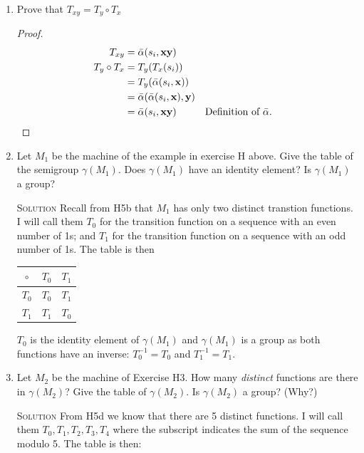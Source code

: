 \documentclass[twoside]{amsart}
\newcommand{\solution}{\textsc{Solution}\xspace}
\begin{document}
\begin{enumerate}[A.]
\begin{enumerate}[1]
      \item Prove that $T_{xy}=T_y \circ T_x$
      \begin{proof}
	  \begin{align*}
             T_{xy} &= \bar{\alpha}(s_i,\mathbf{x}\mathbf{y})\\
	     T_y \circ T_x &= T_y(T_x(s_i)) \\
	                   &= T_y(\bar{\alpha}(s_i,\mathbf{x})) \\
			   &= \bar{\alpha}(\bar{\alpha}(s_i,\mathbf{x}),
			       \mathbf{y}) \\
			   &= \bar{\alpha}(s_i,\mathbf{xy}) 
			       &&\text{Definition of $\bar{\alpha}$}. \qedhere
	  \end{align*}
      \end{proof}

      \item Let $M_1$ be the machine of the example in exercise H above.
      Give the table of the semigroup $\gamma(M_1)$. Does $\gamma(M_1)$
      have an identity element? Is $\gamma(M_1)$ a group?

      \noindent \solution Recall from H5b that $M_1$ has only two distinct
      transtion functions. I will call them $T_0$ for the transition function
      on a sequence with an even number of 1s; and $T_1$ for the transition
      function on a sequence with an odd number of 1s. The table is then

      \begin{center}
      \begin{tabular}{c|cc}
         $\circ$ & $T_0$ & $T_1$ \\ \hline
	   $T_0$ & $T_0$ & $T_1$ \\
	   $T_1$ & $T_1$ & $T_0$ 
      \end{tabular}
      \end{center}

      $T_0$ is the identity element of $\gamma(M_1)$ and 
      $\gamma(M_1)$ is a group as both functions have an inverse:
      $T_0^{-1}=T_0$ and $T_1^{-1}=T_1$.

      \item Let $M_2$ be the machine of Exercise H3. How many \emph{distinct}
      functions are there in $\gamma(M_2)$? Give the table of 
      $\gamma(M_2)$. Is $\gamma(M_2)$ a group? (Why?)

      \solution From H5d we know that there are 5 distinct functions. I
      will call them $T_0, T_1, T_2, T_3, T_4$ where the subscript
      indicates the sum of the sequence modulo 5. The table is then:


\end{enumerate}
\end{enumerate}
\end{document}
